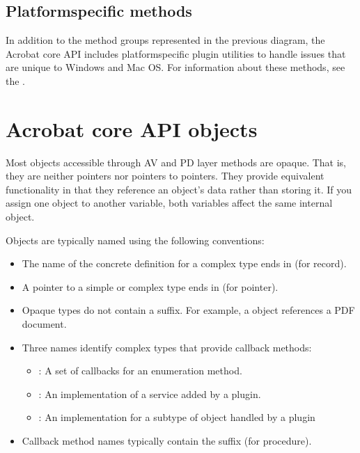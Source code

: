 \documentclass[letterpaper,12pt,english,openany,oneside]{sphinxmanual}
\begin{document}
\subsection{Platform\sphinxhyphen{}specific methods}
\label{\detokenize{index:platform-specific-methods}}
In addition to the method groups represented in the previous diagram, the Acrobat core API includes platform\sphinxhyphen{}specific plugin utilities to handle issues that are unique to Windows and Mac OS. For information about these methods, see the .


\section{Acrobat core API objects}
\label{\detokenize{index:acrobat-core-api-objects}}
Most objects accessible through AV and PD layer methods are opaque. That is, they are neither pointers nor pointers to pointers. They provide equivalent functionality in that they reference an object’s data rather than storing it. If you assign one object to another variable, both variables affect the same internal object.

Objects are typically named using the following conventions:
\begin{itemize}
\item {} 
The name of the concrete definition for a complex type ends in  (for record).

\item {} 
A pointer to a simple or complex type ends in  (for pointer).

\item {} 
Opaque types do not contain a  suffix. For example, a  object references a PDF document.

\item {} 
Three names identify complex types that provide callback methods:
\begin{itemize}
\item {} 
: A set of callbacks for an enumeration method.

\item {} 
: An implementation of a service added by a plugin.

\item {} 
: An implementation for a subtype of object handled by a plugin

\end{itemize}

\item {} 
Callback method names typically contain the suffix  (for procedure).

\end{itemize}
\end{document}

